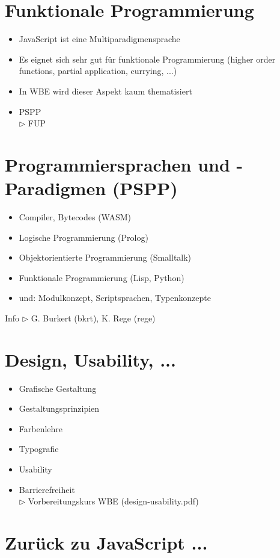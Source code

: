\documentclass[10pt]{article}
\begin{document}
\section*{Funktionale Programmierung}
\begin{itemize}
  \item JavaScript ist eine Multiparadigmensprache
  \item Es eignet sich sehr gut für funktionale Programmierung (higher order functions, partial application, currying, ...)
  \item In WBE wird dieser Aspekt kaum thematisiert
  \item PSPP\\
$\triangleright$ FUP
\end{itemize}

\section*{Programmiersprachen und -Paradigmen (PSPP)}
\begin{itemize}
  \item Compiler, Bytecodes (WASM)
  \item Logische Programmierung (Prolog)
  \item Objektorientierte Programmierung (Smalltalk)
  \item Funktionale Programmierung (Lisp, Python)
  \item und: Modulkonzept, Scriptsprachen, Typenkonzepte
\end{itemize}

Info $\triangleright$ G. Burkert (bkrt), K. Rege (rege)



\section*{Design, Usability, ...}
\begin{itemize}
  \item Grafische Gestaltung
  \item Gestaltungsprinzipien
  \item Farbenlehre
  \item Typografie
  \item Usability
  \item Barrierefreiheit\\
$\triangleright$ Vorbereitungskurs WBE (design-usability.pdf)
\end{itemize}

\section*{Zurück zu JavaScript ...}
\end{document}
